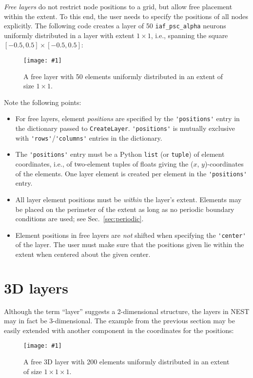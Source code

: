 \documentclass[a4paper,12pt]{report}
\newcommand{\scriptfig}[4]{%
\begin{figure}
\centerline{\texttt{[image: \#1]}}
\caption[#3]{#4}
\label{fig:#1}
\end{figure}%
}
\begin{document}
\emph{Free layers} do not restrict node positions to
a grid, but allow free placement within the extent. To this end, the
user needs to specify the positions of all nodes explicitly. The
following code creates a layer of 50 \lstinline!iaf_psc_alpha! neurons
uniformly distributed in a layer with extent $1\times 1$, i.e.,
spanning the square $[-0.5,0.5]\times[-0.5,0.5]$:
%
\newline

\scriptfig{layer4}{0.5}{Layer with freely spaced elements.}%
{A free layer with 50 elements uniformly distributed in an extent of
size $1\times 1$.}
%
Note the following points:
\begin{itemize}
\item For free layers, element \emph{positions} are
  specified by the \lstinline!'positions'! entry in the dictionary
  passed to \lstinline!CreateLayer!. \lstinline!'positions'! is
  mutually exclusive with \lstinline!'rows'!/\lstinline!'columns'!
  entries in the dictionary.
\item The \lstinline!'positions'! entry must be a Python
  \lstinline!list! (or \lstinline!tuple!) of element coordinates,
  i.e., of two-element tuples of floats giving the ($x$, $y$)-coordinates
  of the elements. One layer element is created per element in the
  \lstinline!'positions'! entry.
\item All layer element positions must be \emph{within} the layer's
  extent. Elements may be placed on the perimeter of the extent as long
  as no periodic boundary conditions are used; see Sec.~\ref{sec:periodic}.
\item Element positions in free layers are \emph{not} shifted when
  specifying the \lstinline!'center'! of the layer. The user must make
  sure that the positions given lie within the extent when centered
  about the given center.
\end{itemize}


\section{3D layers}\label{sec:3dlayer}

Although the term ``layer'' suggests a 2-dimensional structure, the layers
in NEST may in fact be 3-dimensional.  The example from
the previous section may be easily extended with another component in the
coordinates for the positions:
%

\scriptfig{layer4_3d}{0.5}{3D layer with freely spaced elements.}%
{A free 3D layer with 200 elements uniformly distributed in an extent of
size $1\times 1\times 1$.}
%
\end{document}
